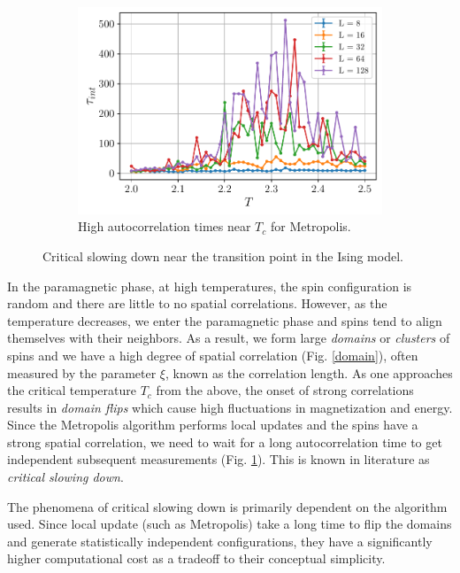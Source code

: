 \documentclass[../thesis_main.tex]{subfiles}
\begin{document}
\begin{figure}[!htb]
\begin{subfigure}[b]{0.5\textwidth}
        \centering
        \includegraphics[width=\textwidth]{images/monte_carlo/metropolis_autocorr_time.pdf}
        \caption{High autocorrelation times near $T_c$ for Metropolis.}
        \label{autocorr_metropolis}
    \end{subfigure}
    \caption{Critical slowing down near the transition point in the Ising model.}
    \label{}
\end{figure}
\!\!\!In the paramagnetic phase, at high temperatures, the spin configuration is random and there are little to no spatial correlations. However, as the temperature decreases, we enter the paramagnetic phase and spins tend to align themselves with their neighbors. As a result, we form large \textit{domains} or \textit{clusters} of spins and we have a high degree of spatial correlation (Fig. \ref{domain}), often measured by the parameter $\xi$, known as the correlation length. As one approaches the critical temperature $T_c$ from the above, the onset of strong correlations results in \textit{domain flips} which cause high fluctuations in magnetization and energy. Since the Metropolis algorithm performs local updates and the spins have a strong spatial correlation, we need to wait for a long autocorrelation time to get independent subsequent measurements (Fig. \ref{autocorr_metropolis}). This is known in literature as \textit{critical slowing down}.

The phenomena of critical slowing down is primarily dependent on the algorithm used. Since local update (such as Metropolis) take a long time to flip the domains and generate statistically independent configurations, they have a significantly higher computational cost as a tradeoff to their conceptual simplicity.
\end{document}
